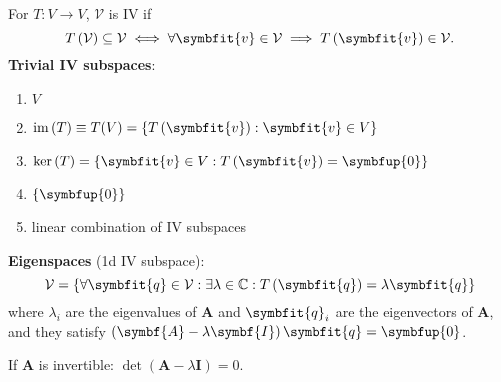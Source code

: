 \documentclass{article}
\begin{document}
\begin{minipage}[t]{126.1962963mm}
\begin{multicols*}{2}
        For \(T:V\rightarrow V\), \(\mathcal{V}\) is IV if
        \begin{equation*}
            T\left(\mathcal{V}\right)\subseteq \mathcal{V}\iff\forall \symbfit{v}
            \in \mathcal{V}\implies T\left(\symbfit{v}\right)\in \mathcal{V}.
        \end{equation*}
        \textbf{Trivial IV subspaces}:
        \begin{enumerate}
            \item \(V\)
            \item \(\vim{\left( T \right)} \equiv T(V) = \left\{ T\left(\symbfit{v}\right) : \symbfit{v}\in V \right\}\)
            \item \(\vker{\left( T \right)} = \left\{ \symbfit{v}\in V : T\left(\symbfit{v}\right) = \symbfup{0} \right\}\)
            \item \(\left\{ \symbfup{0} \right\}\)
            \item linear combination of IV subspaces
        \end{enumerate}
        \textbf{Eigenspaces} (1d IV subspace):
        \begin{equation*}
            \mathcal{V} = \left\{ \forall \symbfit{q}\in \mathcal{V}:\exists
            \lambda \in \mathbb{C}:T\left(\symbfit{q}\right) = \lambda \symbfit{q} \right\}
        \end{equation*}
        where \(\lambda_i\) are the eigenvalues of \(\symbf{A}\) and
        \(\symbfit{q}_i\) are the eigenvectors of \(\symbf{A}\), and they satisfy
        \(\left( \symbf{A} - \lambda \symbf{I} \right) \symbfit{q}=\symbfup{0}\).

        If \(\symbf{A}\) is invertible:
        \(\det{\left( \symbf{A} - \lambda\symbf{I} \right)} = 0\).


\end{multicols*}
\end{minipage}
\end{document}
